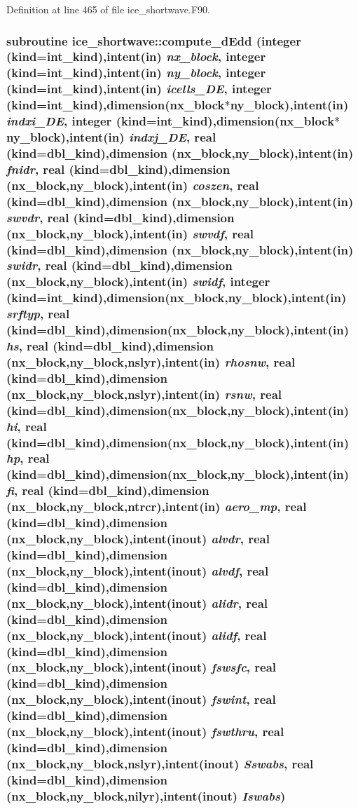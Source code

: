 Definition at line 465 of file ice\_\-shortwave.F90.\hypertarget{namespaceice__shortwave_ab654ccf63c1d24f5ce7b878325222232}{
\subsubsection[{compute\_\-dEdd}]{\setlength{\rightskip}{0pt plus 5cm}subroutine ice\_\-shortwave::compute\_\-dEdd (integer (kind=int\_\-kind),intent(in) {\em nx\_\-block}, \/  integer (kind=int\_\-kind),intent(in) {\em ny\_\-block}, \/  integer (kind=int\_\-kind),intent(in) {\em icells\_\-DE}, \/  integer (kind=int\_\-kind),dimension(nx\_\-block$\ast$ny\_\-block),intent(in) {\em indxi\_\-DE}, \/  integer (kind=int\_\-kind),dimension(nx\_\-block$\ast$ny\_\-block),intent(in) {\em indxj\_\-DE}, \/  real (kind=dbl\_\-kind),dimension (nx\_\-block,ny\_\-block),intent(in) {\em fnidr}, \/  real (kind=dbl\_\-kind),dimension (nx\_\-block,ny\_\-block),intent(in) {\em coszen}, \/  real (kind=dbl\_\-kind),dimension (nx\_\-block,ny\_\-block),intent(in) {\em swvdr}, \/  real (kind=dbl\_\-kind),dimension (nx\_\-block,ny\_\-block),intent(in) {\em swvdf}, \/  real (kind=dbl\_\-kind),dimension (nx\_\-block,ny\_\-block),intent(in) {\em swidr}, \/  real (kind=dbl\_\-kind),dimension (nx\_\-block,ny\_\-block),intent(in) {\em swidf}, \/  integer (kind=int\_\-kind),dimension(nx\_\-block,ny\_\-block),intent(in) {\em srftyp}, \/  real (kind=dbl\_\-kind),dimension(nx\_\-block,ny\_\-block),intent(in) {\em hs}, \/  real (kind=dbl\_\-kind),dimension (nx\_\-block,ny\_\-block,nslyr),intent(in) {\em rhosnw}, \/  real (kind=dbl\_\-kind),dimension (nx\_\-block,ny\_\-block,nslyr),intent(in) {\em rsnw}, \/  real (kind=dbl\_\-kind),dimension(nx\_\-block,ny\_\-block),intent(in) {\em hi}, \/  real (kind=dbl\_\-kind),dimension(nx\_\-block,ny\_\-block),intent(in) {\em hp}, \/  real (kind=dbl\_\-kind),dimension(nx\_\-block,ny\_\-block),intent(in) {\em fi}, \/  real (kind=dbl\_\-kind),dimension (nx\_\-block,ny\_\-block,ntrcr),intent(in) {\em aero\_\-mp}, \/  real (kind=dbl\_\-kind),dimension (nx\_\-block,ny\_\-block),intent(inout) {\em alvdr}, \/  real (kind=dbl\_\-kind),dimension (nx\_\-block,ny\_\-block),intent(inout) {\em alvdf}, \/  real (kind=dbl\_\-kind),dimension (nx\_\-block,ny\_\-block),intent(inout) {\em alidr}, \/  real (kind=dbl\_\-kind),dimension (nx\_\-block,ny\_\-block),intent(inout) {\em alidf}, \/  real (kind=dbl\_\-kind),dimension (nx\_\-block,ny\_\-block),intent(inout) {\em fswsfc}, \/  real (kind=dbl\_\-kind),dimension (nx\_\-block,ny\_\-block),intent(inout) {\em fswint}, \/  real (kind=dbl\_\-kind),dimension (nx\_\-block,ny\_\-block),intent(inout) {\em fswthru}, \/  real (kind=dbl\_\-kind),dimension (nx\_\-block,ny\_\-block,nslyr),intent(inout) {\em Sswabs}, \/  real (kind=dbl\_\-kind),dimension (nx\_\-block,ny\_\-block,nilyr),intent(inout) {\em Iswabs})}}
\label{namespaceice__shortwave_ab654ccf63c1d24f5ce7b878325222232}


